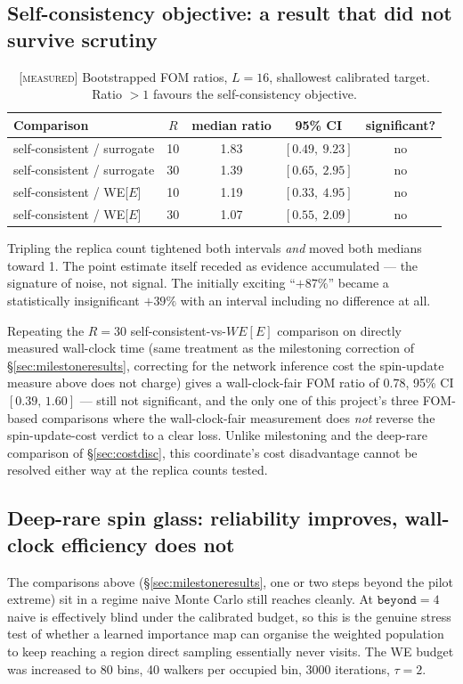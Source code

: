 \documentclass[11pt,a4paper]{article}
\newcommand{\MEAS}{\textcolor{blue!60!black}{\footnotesize[\textsc{measured}]}}
\begin{document}
\subsection{Self-consistency objective: a result that did not survive scrutiny}
\begin{table}[H]\centering\small
\caption{\MEAS{} Bootstrapped FOM ratios, $L=16$, shallowest calibrated target. Ratio $>1$ favours
the self-consistency objective.}
\begin{tabular}{lcccc}\toprule
Comparison & $R$ & median ratio & 95\% CI & significant?\\\midrule
self-consistent / surrogate & 10 & 1.83 & $[0.49,\ 9.23]$ & no\\
self-consistent / surrogate & 30 & 1.39 & $[0.65,\ 2.95]$ & no\\
self-consistent / WE[$E$] & 10 & 1.19 & $[0.33,\ 4.95]$ & no\\
self-consistent / WE[$E$] & 30 & 1.07 & $[0.55,\ 2.09]$ & no\\
\bottomrule\end{tabular}
\end{table}

Tripling the replica count tightened both intervals \emph{and} moved both medians toward 1. The
point estimate itself receded as evidence accumulated --- the signature of noise, not signal. The
initially exciting ``$+87\%$'' became a statistically insignificant $+39\%$ with an interval
including no difference at all.

Repeating the $R=30$ self-consistent-vs-$WE[E]$ comparison on directly measured wall-clock time
(same treatment as the milestoning correction of \S\ref{sec:milestoneresults}, correcting for the
network inference cost the spin-update measure above does not charge) gives a wall-clock-fair FOM
ratio of $0.78$, 95\% CI $[0.39,\,1.60]$ --- still not significant, and the only one of this
project's three FOM-based comparisons where the wall-clock-fair measurement does \emph{not}
reverse the spin-update-cost verdict to a clear loss. Unlike milestoning and the deep-rare
comparison of \S\ref{sec:costdisc}, this coordinate's cost disadvantage cannot be resolved either
way at the replica counts tested.

\subsection{Deep-rare spin glass: reliability improves, wall-clock efficiency does not}\label{sec:deepwithin}
The comparisons above (\S\ref{sec:milestoneresults}, one or two steps beyond the pilot extreme)
sit in a regime naive Monte Carlo still reaches cleanly. At $\texttt{beyond}=4$
naive is effectively blind under the calibrated budget, so this is the genuine stress test of
whether a learned importance map can organise the weighted population to keep reaching a region
direct sampling essentially never visits. The WE budget was increased to 80 bins, 40 walkers per
occupied bin, 3000 iterations, $\tau=2$.
\end{document}
